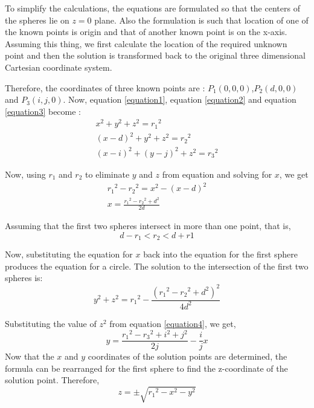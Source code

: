 To simplify the calculations, the equations are formulated so that the centers of the spheres lie on $z=0$ plane. Also the formulation is such that location of one of the known points is origin and that of another known point is on the x-axis. Assuming this thing, we first calculate the location of the required unknown point and then the solution is transformed back to the original three dimensional Cartesian coordinate system.

Therefore, the coordinates of three known points are : $P_1(0,0,0)$,$P_2(d,0,0)$ and $P_3(i,j,0)$. Now, equation \ref{equation1}, equation \ref{equation2} and equation \ref{equation3} become :
\begin{eqnarray}
	\label{equation4}  x^2+y^2+z^2={r_1}^2 \\ 
	\label{equation5} (x-d)^2+y^2+z^2={r_2}^2 \\ 
	\label{equation6} (x-i)^2+(y-j)^2+z^2={r_3}^2 
\end{eqnarray}

Now, using $r_1$ and $r_2$ to eliminate $y$ and $z$ from equation and solving for $x$, we get
\begin{eqnarray}
\nonumber	{r_1}^2-{r_2}^2=x^2-(x-d)^2 \\ 
	x=\frac{{r_1}^2-{r_2}^2+d^2}{2d}
\end{eqnarray}

Assuming that the first two spheres intersect in more than one point, that is,
\begin{equation}
	d-r_1<r_2<d+r1 \nonumber
\end{equation}

Now, substituting the equation for $x$ back into the equation for the first sphere produces the equation for a circle. The solution to the intersection of the first two spheres is:
\begin{equation}
y^2+z^2={r_1}^2-\frac{({r_1}^2-{r_2}^2+d^2)^2}{4d^2} \nonumber
\end{equation}

Substituting the value of $z^2$ from equation \ref{equation4}, we get, 
\begin{equation}
y=\frac{{r_1}^2-{r_3}^2+i^2+j^2}{2j}-\frac{i}{j}x
\end{equation}
Now that the $x$ and $y$ coordinates of the solution points are determined, the formula can be rearranged for the first sphere to find the z-coordinate of the solution point. Therefore,
\begin{equation}
	z=\pm \sqrt{{r_1}^2-x^2-y^2}
\end{equation}

